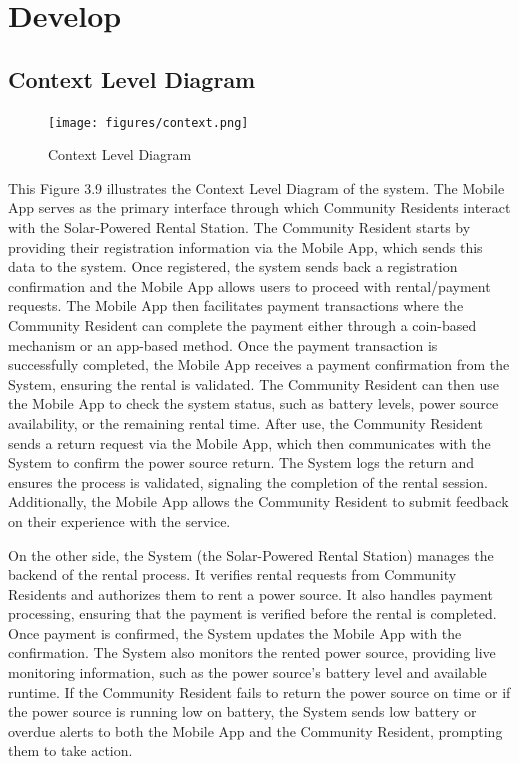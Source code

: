 {\section{Develop}

\subsection{Context Level Diagram}

\begin{figure}[H]
	\centering
	\caption{Context Level Diagram}
	\label{fig:context level diagram}
	\texttt{[image: figures/context.png]}
\end{figure}

This Figure 3.9 illustrates the Context Level Diagram of the system. The Mobile App serves as the primary interface through which Community Residents interact with the Solar-Powered Rental Station. The Community Resident starts by providing their registration information via the Mobile App, which sends this data to the system. Once registered, the system sends back a registration confirmation and the Mobile App allows users to proceed with rental/payment requests. The Mobile App then facilitates payment transactions where the Community Resident can complete the payment either through a coin-based mechanism or an app-based method. Once the payment transaction is successfully completed, the Mobile App receives a payment confirmation from the System, ensuring the rental is validated. The Community Resident can then use the Mobile App to check the system status, such as battery levels, power source availability, or the remaining rental time. After use, the Community Resident sends a return request via the Mobile App, which then communicates with the System to confirm the power source return. The System logs the return and ensures the process is validated, signaling the completion of the rental session. Additionally, the Mobile App allows the Community Resident to submit feedback on their experience with the service.

On the other side, the System (the Solar-Powered Rental Station) manages the backend of the rental process. It verifies rental requests from Community Residents and authorizes them to rent a power source. It also handles payment processing, ensuring that the payment is verified before the rental is completed. Once payment is confirmed, the System updates the Mobile App with the confirmation. The System also monitors the rented power source, providing live monitoring information, such as the power source’s battery level and available runtime. If the Community Resident fails to return the power source on time or if the power source is running low on battery, the System sends low battery or overdue alerts to both the Mobile App and the Community Resident, prompting them to take action. 

}
